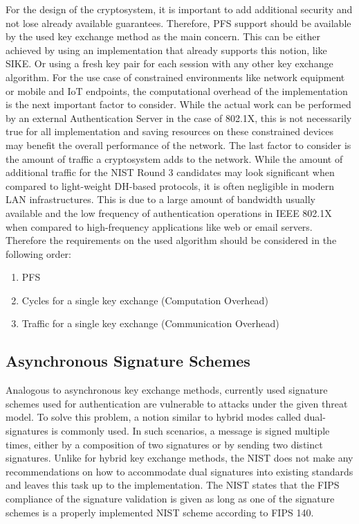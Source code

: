 For the design of the cryptosystem, it is important to add additional security and not lose already available guarantees. Therefore, \ac{PFS} support should be available by the used key exchange method as the main concern. This can be either achieved by using an implementation that already supports this notion, like SIKE. Or using a fresh key pair for each session with any other key exchange algorithm. For the use case of constrained environments like network equipment or mobile and \ac{IoT} endpoints, the computational overhead of the implementation is the next important factor to consider. While the actual work can be performed by an external Authentication Server in the case of 802.1X, this is not necessarily true for all implementation and saving resources on these constrained devices may benefit the overall performance of the network. The last factor to consider is the amount of traffic a cryptosystem adds to the network. While the amount of additional traffic for the NIST Round 3 candidates may look significant when compared to light-weight DH-based protocols, it is often negligible in modern \ac{LAN} infrastructures. This is due to a large amount of bandwidth usually available and the low frequency of authentication operations in IEEE 802.1X when compared to high-frequency applications like web or email servers. Therefore the requirements on the used algorithm should be considered in the following order:

\begin{enumerate}[itemsep=0pt]
    \item \acl{PFS}
    \item Cycles for a single key exchange (Computation Overhead)
    \item Traffic for a single key exchange (Communication Overhead)
\end{enumerate}

\subsection{Asynchronous Signature Schemes}
Analogous to asynchronous key exchange methods, currently used signature schemes used for authentication are vulnerable to attacks under the given threat model. To solve this problem, a notion similar to hybrid modes called dual-signatures is commonly used. In such scenarios, a message is signed multiple times, either by a composition of two signatures or by sending two distinct signatures. Unlike for hybrid key exchange methods, the \ac{NIST} does not make any recommendations on how to accommodate dual signatures into existing standards and leaves this task up to the implementation. The \ac{NIST} states that the \ac{FIPS} compliance of the signature validation is given as long as one of the signature schemes is a properly implemented \ac{NIST} scheme according to \ac{FIPS} 140.

